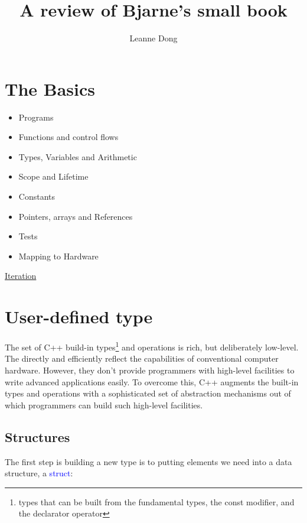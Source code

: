 \documentclass{article}
\title{A review of Bjarne's small book}
\author{Leanne Dong}
\newcommand{\be}[1]{\textcolor{blue}{#1}}
\begin{document}
	\maketitle
	\tableofcontents
\section{The Basics}
\begin{itemize}
	\item Programs
	\item Functions and control flows
	\item Types, Variables and Arithmetic
	\item Scope and Lifetime
	\item Constants
	\item Pointers, arrays and References
	\item Tests
	\item Mapping to Hardware
\end{itemize}

\href{https://gcc.godbolt.org/z/bah4zM}{Iteration}
\section{User-defined type}
The set of C++ build-in types\footnote{types that can be built from the fundamental types, the const modifier, and the declarator operator} and operations is rich, but deliberately low-level. The directly and efficiently reflect the capabilities of conventional computer hardware. However, they don't provide programmers with high-level facilities to write advanced applications easily. To overcome this, C++ augments the built-in types and operations with a sophisticated set of abstraction mechanisms out of which programmers can build such high-level facilities.

\subsection{Structures}

The first step is building a new type is to putting elements we need into a data structure, a \be{struct}:
\end{document}
